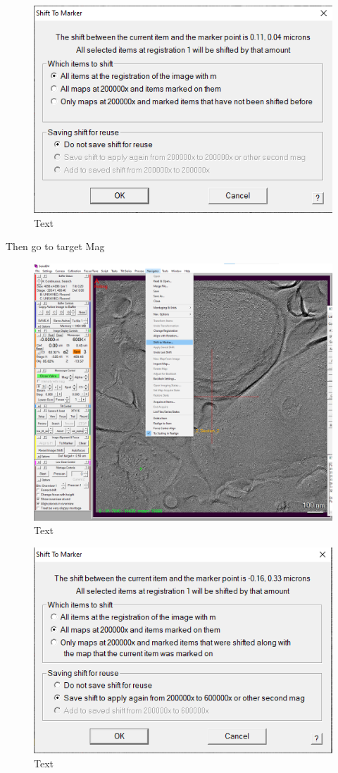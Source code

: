 \documentclass[12pt, a4paper]{scrartcl}
\begin{document}
\begin{figure}[H]
\includegraphics[width=\linewidth]{screenshots/ShiftToMarkerMapMenu.png}
\caption{Text}
\end{figure}

Then go to target Mag

\begin{figure}[H]
\includegraphics[width=\linewidth]{screenshots/ShiftToMarkerZoom.png}
\caption{Text}
\end{figure}

\begin{figure}[H]
\includegraphics[width=\linewidth]{screenshots/ShiftToMarkerZoomMenu.png}
\caption{Text}
\end{figure}
\end{document}
